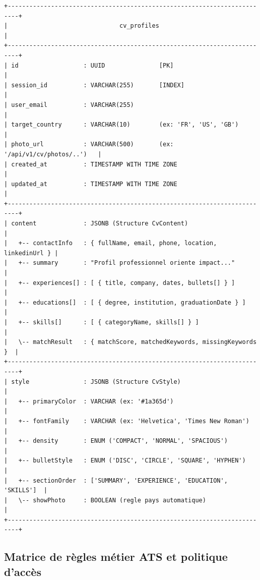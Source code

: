\documentclass[11pt,a4paper]{article}
\begin{document}
\begin{center}
\begin{verbatim}
+-------------------------------------------------------------------------+
|                               cv_profiles                               |
+-------------------------------------------------------------------------+
| id                  : UUID               [PK]                           |
| session_id          : VARCHAR(255)       [INDEX]                        |
| user_email          : VARCHAR(255)                                      |
| target_country      : VARCHAR(10)        (ex: 'FR', 'US', 'GB')         |
| photo_url           : VARCHAR(500)       (ex: '/api/v1/cv/photos/..')   |
| created_at          : TIMESTAMP WITH TIME ZONE                          |
| updated_at          : TIMESTAMP WITH TIME ZONE                          |
+-------------------------------------------------------------------------+
| content             : JSONB (Structure CvContent)                       |
|   +-- contactInfo   : { fullName, email, phone, location, linkedinUrl } |
|   +-- summary       : "Profil professionnel oriente impact..."          |
|   +-- experiences[] : [ { title, company, dates, bullets[] } ]          |
|   +-- educations[]  : [ { degree, institution, graduationDate } ]       |
|   +-- skills[]      : [ { categoryName, skills[] } ]                    |
|   \-- matchResult   : { matchScore, matchedKeywords, missingKeywords }  |
+-------------------------------------------------------------------------+
| style               : JSONB (Structure CvStyle)                         |
|   +-- primaryColor  : VARCHAR (ex: '#1a365d')                           |
|   +-- fontFamily    : VARCHAR (ex: 'Helvetica', 'Times New Roman')      |
|   +-- density       : ENUM ('COMPACT', 'NORMAL', 'SPACIOUS')            |
|   +-- bulletStyle   : ENUM ('DISC', 'CIRCLE', 'SQUARE', 'HYPHEN')       |
|   +-- sectionOrder  : ['SUMMARY', 'EXPERIENCE', 'EDUCATION', 'SKILLS']  |
|   \-- showPhoto     : BOOLEAN (regle pays automatique)                  |
+-------------------------------------------------------------------------+
\end{verbatim}
\end{center}

\subsection{Matrice de règles métier ATS et politique d'accès}
\end{document}

